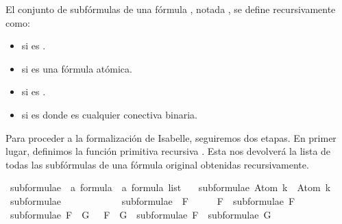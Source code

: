\begin{isabellebody}
\begin{isamarkuptext}
  \begin{definicion}
  El conjunto de subfórmulas de una fórmula , notada , se define recursivamente como:
    \begin{itemize}
      \item \isa{{\isacharbraceleft}{\isasymbottom}{\isacharbraceright}} si  es \isa{{\isasymbottom}}.
      \item {} si  es una fórmula atómica.
      \item {} si  es .
      \item {} si  es  donde \isa{{\isacharasterisk}} es cualquier conectiva binaria.
    \end{itemize}
  \end{definicion}%
\end{isamarkuptext}\isamarkuptrue%
%
\begin{isamarkuptext}%
Para proceder a la formalización de Isabelle, seguiremos dos etapas. En primer lugar, 
  definimos la función primitiva recursiva . Esta nos devolverá
  la lista de todas las subfórmulas de una fórmula original obtenidas recursivamente.%
\end{isamarkuptext}\isamarkuptrue%
\isamarkupfalse%
\ subformulae\ {\isacharcolon}{\isacharcolon}\ {\isachardoublequoteopen}{\isacharprime}a\ formula\ {\isasymRightarrow}\ {\isacharprime}a\ formula\ list{\isachardoublequoteclose}\ \isanewline
\ \ {\isachardoublequoteopen}subformulae\ {\isacharparenleft}Atom\ k{\isacharparenright}\ {\isacharequal}\ {\isacharbrackleft}Atom\ k{\isacharbrackright}{\isachardoublequoteclose}\ \isanewline
{\isacharbar}\ {\isachardoublequoteopen}subformulae\ {\isasymbottom}\ \ \ \ \ \ \ \ {\isacharequal}\ {\isacharbrackleft}{\isasymbottom}{\isacharbrackright}{\isachardoublequoteclose}\ \isanewline
{\isacharbar}\ {\isachardoublequoteopen}subformulae\ {\isacharparenleft}\isactrlbold {\isasymnot}\ F{\isacharparenright}\ \ \ \ {\isacharequal}\ {\isacharparenleft}\isactrlbold {\isasymnot}\ F{\isacharparenright}\ {\isacharhash}\ subformulae\ F{\isachardoublequoteclose}\ \isanewline
{\isacharbar}\ {\isachardoublequoteopen}subformulae\ {\isacharparenleft}F\ \isactrlbold {\isasymand}\ G{\isacharparenright}\ \ {\isacharequal}\ {\isacharparenleft}F\ \isactrlbold {\isasymand}\ G{\isacharparenright}\ {\isacharhash}\ subformulae\ F\ {\isacharat}\ subformulae\ G{\isachardoublequoteclose}\ \isanewline

\end{isabellebody}
